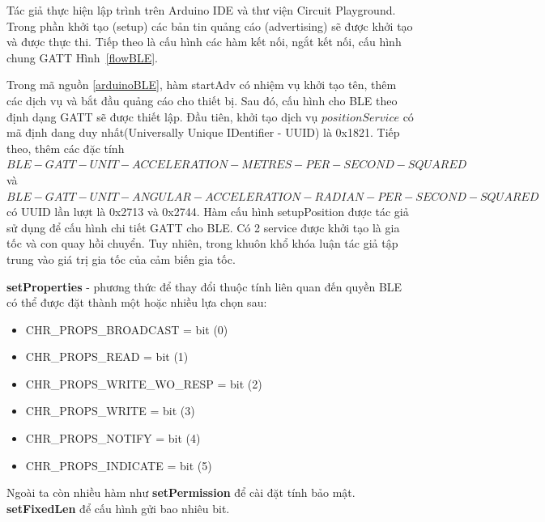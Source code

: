 


Tác giả thực hiện lập trình trên Arduino IDE và thư viện Circuit Playground. Trong phần khởi tạo (setup) các bản tin quảng cáo (advertising) sẽ được khởi tạo và được thực thi. Tiếp theo là cấu hình các hàm kết nối, ngắt kết nối, cấu hình chung \gls{GATT} Hình~\ref{flowBLE}.



Trong mã nguồn \ref{arduinoBLE}, hàm startAdv có nhiệm vụ khởi tạo tên, thêm các dịch vụ và bắt đầu quảng cáo cho thiết bị. Sau đó, cấu hình cho \gls{BLE} theo định dạng \gls{GATT} sẽ được thiết lập. Đầu tiên, khởi tạo dịch vụ $positionService$ có mã định dang duy nhất(Universally Unique IDentifier - UUID) là 0x1821. Tiếp theo, thêm các đặc tính $BLE-GATT-UNIT-ACCELERATION
-METRES-PER-SECOND-SQUARED
$ và $BLE-GATT-UNIT-ANGULAR-ACCELERATION
-RADIAN-PER-SECOND-SQUARED
$ có UUID lần lượt là 0x2713 và 0x2744. Hàm cấu hình setupPosition được tác giả sử dụng để cấu hình chi tiết GATT cho BLE. Có 2 service được khởi tạo là gia tốc và con quay hồi chuyển. Tuy nhiên, trong khuôn khổ khóa luận tác giả tập trung vào giá trị gia tốc của cảm biến gia tốc. 





\textbf{setProperties} - phương thức để thay đổi thuộc tính liên quan đến quyền BLE có thể được đặt thành một hoặc nhiều lựa chọn sau:

\begin{itemize}
    \item CHR\_PROPS\_BROADCAST = bit (0)
    
    \item CHR\_PROPS\_READ = bit (1)
    
    \item CHR\_PROPS\_WRITE\_WO\_RESP = bit (2)
    
    \item CHR\_PROPS\_WRITE = bit (3)
    
    \item CHR\_PROPS\_NOTIFY = bit (4)
    
    \item CHR\_PROPS\_INDICATE = bit (5)
\end{itemize}
Ngoài ta còn nhiều hàm như \textbf{setPermission} để cài đặt tính bảo mật. \textbf{setFixedLen} để cấu hình gửi bao nhiêu bit.





